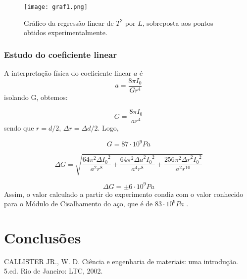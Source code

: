 \documentclass[12pt,a4paper]{article}
\begin{document}
\begin{figure}[!htbp]
 
\texttt{[image: graf1.png]}
\caption{Gráfico da regressão linear de $T^2$ por $L$, sobreposta aos pontos obtidos experimentalmente.} 
\end{figure} 
\subsubsection{Estudo do coeficiente linear}

A interpretação física do coeficiente linear $a$ é 
$$ a = \frac{8\pi I_0}{G r^4}  $$
isolando G, obtemos:

$$ G = \frac{8\pi I_0}{a r^4}  $$
sendo que $r = d/2$, $\Delta r = {\Delta d}/{2} $. Logo,

$$ G =  87 \cdot 10^9 Pa $$

$$ \Delta G = \sqrt{\frac{64 \pi^{2} {\Delta I_0}^{2}}{a^{2} r^{8}} + \frac{64 \pi^{2} {\Delta a}^{2} {I_0}^{2}}{a^{4} r^{8}} + \frac{256 \pi^{2} {\Delta r}^{2} {I_0}^{2}}{a^{2} r^{10}}} $$


$$ \Delta G = \pm 6 \cdot 10^9 Pa$$
Assim, o valor calculado a partir do experimento condiz com o valor conhecido para o Módulo de Cisalhamento do aço, que é de $83 \cdot 10^9 Pa$ \cite{callister}.





\section{Conclusões}



\begin{thebibliography}{9}

  CALLISTER JR., W. D. Ciência e engenharia de materiais: uma introdução. 5.ed. Rio de Janeiro: LTC, 2002.

\end{thebibliography}
\end{document}
